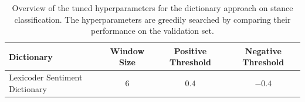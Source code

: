 \begin{table}[htbp]
\centering
\begin{tabular}{lccc}
\toprule
Dictionary & Window Size & Positive Threshold & Negative Threshold \\
\midrule
Lexicoder Sentiment Dictionary & $6$ & $0.4$ & $-0.4$ \\
\bottomrule
\end{tabular}
\caption[Tuned hyperparameters for dictionary method on stance classification]{Overview of the tuned hyperparameters for the dictionary approach on stance classification. The hyperparameters are greedily searched by comparing their performance on the validation set.}
\label{tab:tuned_hyperparams_dictionary_stance}
\end{table}
